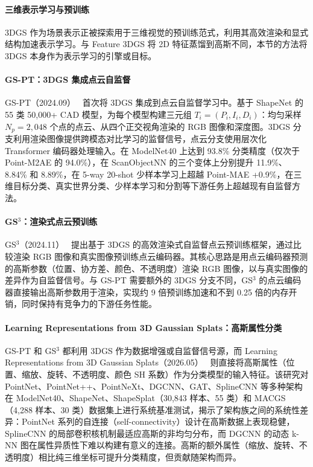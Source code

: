 \paragraph{三维表示学习与预训练}

3DGS 作为场景表示正被探索用于三维视觉的预训练范式，利用其高效渲染和显式结构加速表示学习。与 Feature 3DGS 将 2D 特征蒸馏到高斯不同，本节的方法将 3DGS 本身作为表示学习的引擎或目标。

\paragraph{GS-PT：3DGS 集成点云自监督} GS-PT（2024.09）~\cite{2409_04963} 首次将 3DGS 集成到点云自监督学习中。基于 ShapeNet 的 55 类 50,000+ CAD 模型，为每个模型构建三元组 $T_i = (P_i, I_i, D_i)$：均匀采样 $N_p = 2{,}048$ 个点的点云、从四个正交视角渲染的 RGB 图像和深度图。3DGS 分支利用渲染图像提供跨模态对比学习的监督信号，点云分支使用层次化 Transformer 编码器处理输入。在 ModelNet40 上达到 93.8\% 分类精度（仅次于 Point-M2AE 的 94.0\%），在 ScanObjectNN 的三个变体上分别提升 11.9\%、8.84\% 和 8.89\%，在 5-way 20-shot 少样本学习上超越 Point-MAE +0.9\%，在三维目标分类、真实世界分类、少样本学习和分割等下游任务上超越现有自监督方法。

\paragraph{GS$^3$：渲染式点云预训练} GS$^3$（2024.11）~\cite{2411_18667} 提出基于 3DGS 的高效渲染式自监督点云预训练框架，通过比较渲染 RGB 图像和真实图像预训练点云编码器。其核心思路是用点云编码器预测的高斯参数（位置、协方差、颜色、不透明度）渲染 RGB 图像，以与真实图像的差异作为自监督信号。与 GS-PT 需要额外的 3DGS 分支不同，GS$^3$ 的点云编码器直接输出高斯参数用于渲染，实现约 9 倍预训练加速和不到 0.25 倍的内存开销，同时保持有竞争力的下游任务性能。

\paragraph{Learning Representations from 3D Gaussian Splats：高斯属性分类} GS-PT 和 GS$^3$ 都利用 3DGS 作为数据增强或自监督信号源，而 Learning Representations from 3D Gaussian Splats（2026.05）~\cite{2605_29549} 则直接将高斯属性（位置、缩放、旋转、不透明度、颜色 SH 系数）作为分类模型的输入特征。该研究对 PointNet、PointNet++、PointNeXt、DGCNN、GAT、SplineCNN 等多种架构在 ModelNet40、ShapeNet、ShapeSplat（30,843 样本、55 类）和 MACGS（4,288 样本、30 类）数据集上进行系统基准测试，揭示了架构族之间的系统性差异：PointNet 系列的自连接（self-connectivity）设计在高斯数据上表现稳健，SplineCNN 的局部卷积核机制最适应高斯的非均匀分布，而 DGCNN 的动态 k-NN 图在属性异质性下难以构建有意义的连接。高斯的额外属性（缩放、旋转、不透明度）相比纯三维坐标可提升分类精度，但贡献随架构而异。

